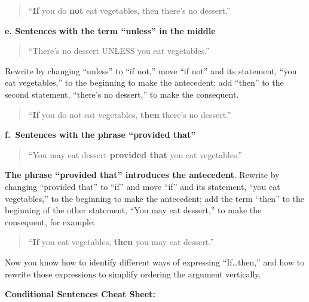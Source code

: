 \documentclass[
]{book}
\begin{document}
\begin{quote}
``\textbf{If} you do \textbf{not} eat vegetables, then there's no dessert.''
\end{quote}

\textbf{e. Sentences with the term ``unless'' in the middle}

\begin{quote}
``There's no dessert UNLESS you eat vegetables.''
\end{quote}

Rewrite by changing ``unless'' to ``if not,'' move ``if not'' and its statement, ``you eat vegetables,'' to the beginning to make the antecedent; add ``then'' to the second statement, ``there's no dessert,'' to make the consequent.

\begin{quote}
``\textbf{If} you do not eat vegetables, \textbf{then} there's no dessert.''
\end{quote}

\textbf{f.~Sentences with the phrase ``provided that''}

\begin{quote}
``You may eat dessert \textbf{provided that} you eat vegetables.''
\end{quote}

\textbf{The phrase ``provided that'' introduces the antecedent}. Rewrite by changing ``provided that'' to ``if'' and move ``if'' and its statement, ``you eat vegetables,'' to the beginning to make the antecedent; add the term ``then'' to the beginning of the other statement, ``You may eat dessert,'' to make the consequent, for example:

\begin{quote}
``\textbf{If} you eat vegetables, \textbf{then} you may eat dessert.''
\end{quote}

Now you know how to identify different ways of expressing ``If\ldots then,'' and how to rewrite those expressions to simplify ordering the argument vertically.

\textbf{Conditional Sentences Cheat Sheet:}
\end{document}

